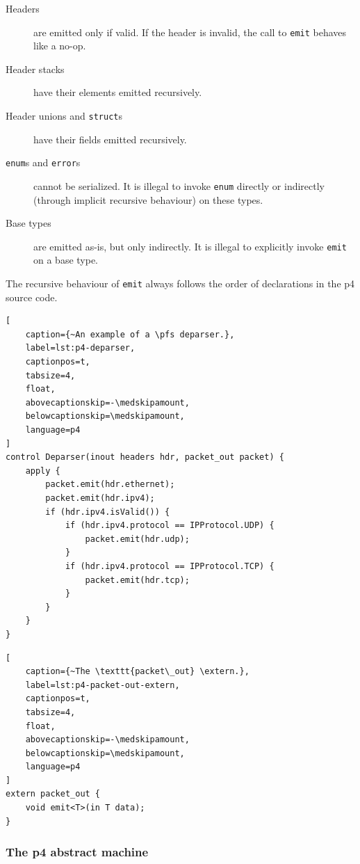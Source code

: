 \begin{description}
	\item[Headers] are emitted only if valid. If the header is invalid, the call to
	\texttt{emit} behaves like a no-op.

	\item[Header stacks] have their elements emitted recursively.

	\item[Header unions and \texttt{struct}s] have their fields emitted
	recursively.

	\item[\texttt{enum}s and \texttt{error}s] cannot be serialized. It is
	illegal to invoke \texttt{enum} directly or indirectly (through implicit
	recursive behaviour) on these types.

	\item[Base types] are emitted as-is, but only indirectly. It is illegal to
	explicitly invoke \texttt{emit} on a base type.
\end{description}

The recursive behaviour of \texttt{emit} always follows the order of
declarations in the \acrshort{p4} source code.

\begin{lstlisting}[
	caption={~An example of a \pfs deparser.},
	label=lst:p4-deparser,
	captionpos=t,
	tabsize=4,
	float,
	abovecaptionskip=-\medskipamount,
	belowcaptionskip=\medskipamount,
	language=p4
]
control Deparser(inout headers hdr, packet_out packet) {
	apply {
		packet.emit(hdr.ethernet);
		packet.emit(hdr.ipv4);
		if (hdr.ipv4.isValid()) {
			if (hdr.ipv4.protocol == IPProtocol.UDP) {
				packet.emit(hdr.udp);
			}
			if (hdr.ipv4.protocol == IPProtocol.TCP) {
				packet.emit(hdr.tcp);
			}
		}
	}
}
\end{lstlisting}

\begin{lstlisting}[
	caption={~The \texttt{packet\_out} \extern.},
	label=lst:p4-packet-out-extern,
	captionpos=t,
	tabsize=4,
	float,
	abovecaptionskip=-\medskipamount,
	belowcaptionskip=\medskipamount,
	language=p4
]
extern packet_out {
	void emit<T>(in T data);
}
\end{lstlisting}


\subsubsection*{The \acrshort{p4} abstract machine}

